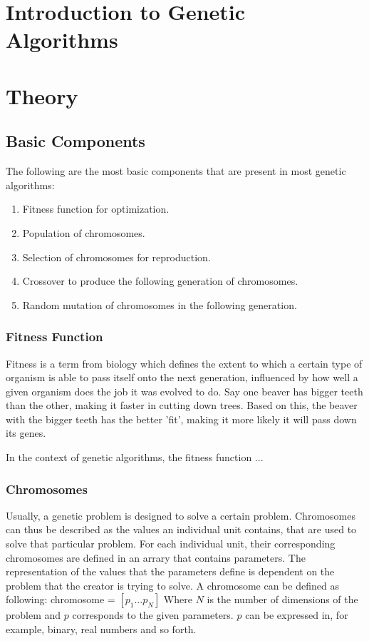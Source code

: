 \documentclass{article}
\begin{document}
\section{Introduction to Genetic Algorithms}
\newpage
\section{Theory}

\subsection{Basic Components}
The following are the most basic components that are present in most genetic algorithms:
\begin{enumerate}
    \item Fitness function for optimization.
    \item Population of chromosomes.
    \item Selection of chromosomes for reproduction.
    \item Crossover to produce the following generation of chromosomes.
    \item Random mutation of chromosomes in the following generation.
\end{enumerate}

\bigbreak
\subsubsection{Fitness Function}
Fitness is a term from biology which defines the extent to which a certain type of organism is able to pass itself onto the next generation, influenced by how well a given organism does the job it was evolved to do. Say one beaver has bigger teeth than the other, making it faster in cutting down trees. Based on this, the beaver with the bigger teeth has the better 'fit', making it more likely it will pass down its genes.

In the context of genetic algorithms, the fitness function ...

\bigbreak
\subsubsection{Chromosomes}
Usually, a genetic problem is designed to solve a certain problem. Chromosomes can thus be described as the values an individual unit contains, that are used to solve that particular problem. For each individual unit, their corresponding chromosomes are defined in an arrary that contains parameters. The representation of the values that the parameters define is dependent on the problem that the creator is trying to solve. A chromosome can be defined as following:\bigbreak
chromosome = $\left[ p_{1} ... p_{N} \right]$\bigbreak
Where $N$ is the number of dimensions of the problem and $p$ corresponds to the given parameters. $p$ can be expressed in, for example, binary, real numbers and so forth.
\end{document}
